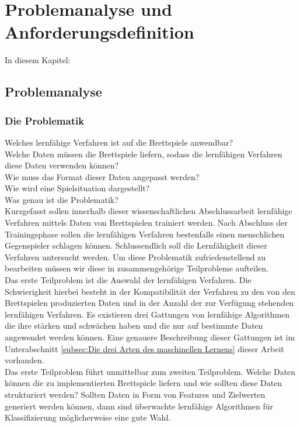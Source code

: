 \chapter{Problemanalyse und Anforderungsdefinition}
\label{cha:pua}

In diesem Kapitel: 
\section{Problemanalyse}

\subsection{Die Problematik}
Welches lernfähige Verfahren ist auf die Brettspiele anwendbar? \\
Welche Daten müssen die Brettspiele liefern, sodass die lernfähigen Verfahren diese Daten verwenden können? \\
Wie muss das Format dieser Daten angepasst werden? \\
Wie wird eine Spielsituation dargestellt? \\

Was genau ist die Problematik?\\
Kurzgefasst sollen innerhalb dieser wissenschaftlichen Abschlussarbeit lernfähige Verfahren mittels Daten von Brettspielen trainiert werden. Nach Abschluss der Trainingsphase sollen die lernfähigen Verfahren bestenfalls einen menschlichen Gegenspieler schlagen können. Schlussendlich soll die Lernfähigkeit dieser Verfahren untersucht werden. Um diese Problematik zufriedenstellend zu bearbeiten müssen wir diese in zusammengehörige Teilprobleme aufteilen. \\

Das erste Teilproblem ist die Auswahl der lernfähigen Verfahren. Die Schwierigkeit hierbei besteht in der Kompatibilität der Verfahren zu den von den Brettspielen produzierten Daten und in der Anzahl der zur Verfügung stehenden lernfähigen Verfahren. Es existieren drei Gattungen von lernfähige Algorithmen die ihre stärken und schwächen haben und die nur auf bestimmte Daten angewendet werden können. Eine genauere Beschreibung dieser Gattungen ist im Unterabschnitt \ref{subsec:Die drei Arten des maschinellen Lernens} dieser Arbeit vorhanden. \\

Das erste Teilproblem führt unmittelbar zum zweiten Teilproblem. Welche Daten können die zu implementierten Brettspiele liefern und wie sollten diese Daten strukturiert werden? Sollten Daten in Form von Features und Zielwerten generiert werden können, dann sind überwachte lernfähige Algorithmen für Klassifizierung möglicherweise eine gute Wahl. 


